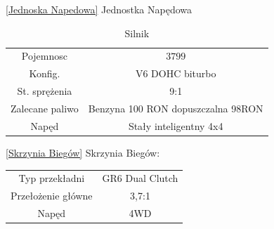 \documentclass[a4paper,12pt]{article}
\begin{document}
\begin{table}
\ref{Jednoska Napedowa}
Jednostka Napędowa
\caption{Silnik} 
\begin{tabular}{c|c}
Pojemnosc & $3799$  \\
Konfig. & V6 DOHC biturbo \\
St. sprężenia & 9:1 \\
Zalecane paliwo & Benzyna 100 RON dopuszczalna 98RON \\
Napęd & Stały inteligentny 4x4
\end{tabular}

\end{table}
\begin{table}
\ref{Skrzynia Biegów} Skrzynia Biegów:
\begin{tabular}{c|c}

Typ przekładni & GR6 Dual Clutch \\
Przełożenie główne & 3,7:1 \\
Napęd & 4WD \\
\end{tabular}

\end{table}
\end{document}
